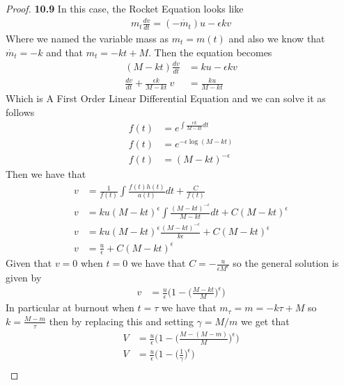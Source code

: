 \documentclass[11pt]{article}
\theoremstyle{definition}
\begin{document}
	\begin{proof}{\textbf{10.9}}
        In this case, the Rocket Equation looks like
        \begin{align*}
            m_t\frac{dv}{dt} = (-\dot{m_t})u - \epsilon kv
        \end{align*} 
        Where we named the variable mass as $m_t = m(t)$ and also we know that
        $\dot{m_t} = -k$ and that $m_t = - kt + M$.
        Then the equation becomes
        \begin{align*}
            (M - kt)\frac{dv}{dt} &= ku - \epsilon kv\\
            \frac{dv}{dt} + \frac{\epsilon k}{M -kt}~v &= \frac{ku}{M-kt}
        \end{align*}
        Which is A First Order Linear Differential Equation and we can solve
        it as follows
        \begin{align*}
            f(t) &= e^{\int \frac{\epsilon k}{M-kt} dt}\\
            f(t) &= e^{-\epsilon\log(M-kt)}\\
            f(t) &= (M-kt)^{-\epsilon}
        \end{align*}
        Then we have that
        \begin{align*}
            v &= \frac{1}{f(t)}\int \frac{f(t)h(t)}{a(t)} dt + \frac{C}{f(t)}\\
            v &= ku(M -kt)^\epsilon \int \frac{(M -kt)^{-\epsilon}}{M -kt} dt
            + C(M -kt)^{\epsilon}\\
            v &= ku(M -kt)^\epsilon \frac{(M-kt)^{-\epsilon}}{k\epsilon}
            + C(M -kt)^{\epsilon}\\
            v &= \frac{u}{\epsilon} + C(M -kt)^{\epsilon}
        \end{align*}
        Given that $v=0$ when $t=0$ we have that
        $C = -\frac{u}{\epsilon M^\epsilon}$ so the general solution is given
        by
        \begin{align*}
            v &= \frac{u}{\epsilon}\bigg(1 -\bigg(\frac{M- kt}{M}\bigg)^{\epsilon}\bigg)
        \end{align*}
        In particular at burnout when $t=\tau$ we have that
        $m_\tau = m = -k\tau + M$ so $k = \frac{M-m}{\tau}$ then by replacing
        this and setting $\gamma = M/m$ we get that
        \begin{align*}
            V &= \frac{u}{\epsilon}\bigg(1 -\bigg(\frac{M - (M-m)}{M}\bigg)^{\epsilon}\bigg)\\
            V &= \frac{u}{\epsilon}\bigg(1 -\bigg(\frac{1}{\gamma}\bigg)^{\epsilon}\bigg)\\

\end{align*}
\end{proof}
\end{document}
